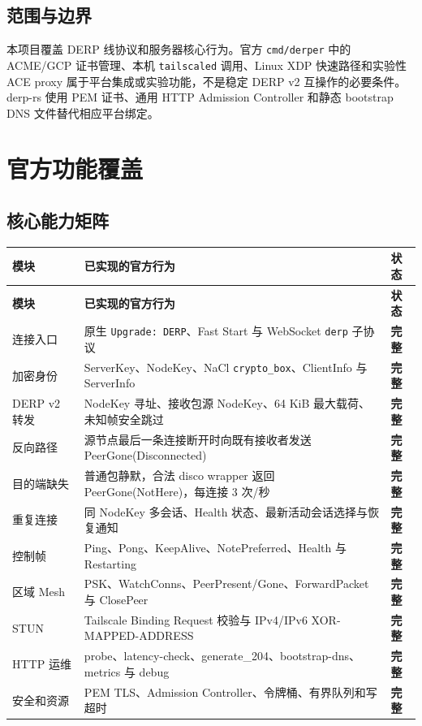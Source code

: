 \documentclass[UTF8,a4paper,zihao=-4]{ctexart}
\newcommand{\code}[1]{\texttt{\small #1}}
\newcommand{\status}{\textcolor{Success}{\textbf{完整}}}
\begin{document}
\subsection{范围与边界}

本项目覆盖 DERP 线协议和服务器核心行为。官方 \code{cmd/derper} 中的 ACME/GCP
证书管理、本机 \code{tailscaled} 调用、Linux XDP 快速路径和实验性 ACE proxy
属于平台集成或实验功能，不是稳定 DERP v2 互操作的必要条件。derp-rs 使用 PEM
证书、通用 HTTP Admission Controller 和静态 bootstrap DNS 文件替代相应平台绑定。

\section{官方功能覆盖}

\subsection{核心能力矩阵}

\begin{longtable}{
  >{\raggedright\arraybackslash}p{}
  >{\raggedright\arraybackslash}p{}
  C{0.12\textwidth}}
\toprule
{}
\color{white}\textbf{模块} &
\color{white}\textbf{已实现的官方行为} &
\color{white}\textbf{状态} \\
\midrule
\endfirsthead
\toprule
{}
\color{white}\textbf{模块} &
\color{white}\textbf{已实现的官方行为} &
\color{white}\textbf{状态} \\
\midrule
\endhead
连接入口 &
原生 \code{Upgrade: DERP}、Fast Start 与 WebSocket \code{derp} 子协议 &
\status \\
加密身份 &
ServerKey、NodeKey、NaCl \code{crypto\_box}、ClientInfo 与 ServerInfo &
\status \\
DERP v2 转发 &
NodeKey 寻址、接收包源 NodeKey、64 KiB 最大载荷、未知帧安全跳过 &
\status \\
反向路径 &
源节点最后一条连接断开时向既有接收者发送 PeerGone(Disconnected) &
\status \\
目的端缺失 &
普通包静默，合法 disco wrapper 返回 PeerGone(NotHere)，每连接 3 次/秒 &
\status \\
重复连接 &
同 NodeKey 多会话、Health 状态、最新活动会话选择与恢复通知 &
\status \\
控制帧 &
Ping、Pong、KeepAlive、NotePreferred、Health 与 Restarting &
\status \\
区域 Mesh &
PSK、WatchConns、PeerPresent/Gone、ForwardPacket 与 ClosePeer &
\status \\
STUN &
Tailscale Binding Request 校验与 IPv4/IPv6 XOR-MAPPED-ADDRESS &
\status \\
HTTP 运维 &
probe、latency-check、generate\_204、bootstrap-dns、metrics 与 debug &
\status \\
安全和资源 &
PEM TLS、Admission Controller、令牌桶、有界队列和写超时 &
\status \\
\bottomrule
\end{longtable}
\end{document}
